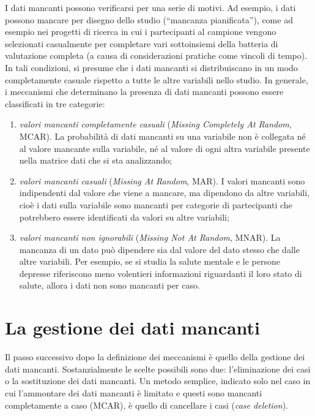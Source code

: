 \documentclass[
  11pt,
]{krantz}
\providecommand{\tightlist}{%
  \setlength{\itemsep}{0pt}\setlength{\parskip}{0pt}}
\theoremstyle{definition}
\theoremstyle{definition}
\theoremstyle{definition}
\theoremstyle{definition}
\theoremstyle{remark}
\begin{document}
I dati mancanti possono verificarsi per una serie di motivi. Ad esempio, i dati possono mancare per disegno dello studio (``mancanza pianificata''), come ad esempio nei progetti di ricerca in cui i partecipanti al campione vengono selezionati casualmente per completare vari sottoinsiemi della batteria di valutazione completa (a causa di considerazioni pratiche come vincoli di tempo). In tali condizioni, si presume che i dati mancanti si distribuiscano in un modo completamente casuale rispetto a tutte le altre variabili nello studio. In generale, i meccanismi che determinano la presenza di dati mancanti possono essere classificati in tre categorie:

\begin{enumerate}
\def\labelenumi{\arabic{enumi}.}
\tightlist
\item
  \emph{valori mancanti completamente casuali} (\emph{Missing Completely At Random}, MCAR). La probabilità di dati mancanti su una variabile non è collegata né al valore mancante sulla variabile, né al valore di ogni altra variabile presente nella matrice dati che si sta analizzando;
\item
  \emph{valori mancanti casuali} (\emph{Missing At Random}, MAR). I valori mancanti sono indipendenti dal valore che viene a mancare, ma dipendono da altre variabili, cioè i dati sulla variabile sono mancanti per categorie di partecipanti che potrebbero essere identificati da valori su altre variabili;
\item
  \emph{valori mancanti non ignorabili} (\emph{Missing Not At Random}, MNAR). La mancanza di un dato può dipendere sia dal valore del dato stesso che dalle altre variabili. Per esempio, se si studia la salute mentale e le persone depresse riferiscono meno volentieri informazioni riguardanti il loro stato di salute, allora i dati non sono mancanti per caso.
\end{enumerate}

\hypertarget{la-gestione-dei-dati-mancanti}{%
\section{La gestione dei dati mancanti}\label{la-gestione-dei-dati-mancanti}}

Il passo successivo dopo la definizione dei meccanismi è quello della gestione dei dati mancanti. Sostanzialmente le scelte possibili sono due: l'eliminazione dei casi o la sostituzione dei dati mancanti. Un metodo semplice, indicato solo nel caso in cui l'ammontare dei dati mancanti è limitato e questi sono mancanti completamente a caso (MCAR), è quello di cancellare i casi (\emph{case deletion}).
\end{document}
